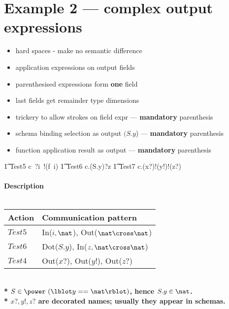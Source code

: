 \documentclass{article}
\begin{document}
\newpage
\section{Example 2 --- complex output expressions}

\begin{itemize}
   \item hard spaces - make no semantic difference
   \item application expressions on output fields
   \item parenthesised expressions form \textbf{one} field
   \item last fields get remainder type dimensions
   \item trickery to allow strokes on field expr --- \textbf{mandatory} parenthesis
   \item schema binding selection as output $(S.y$) --- \textbf{mandatory} parenthesis
   \item function application result as output --- \textbf{mandatory} parenthesis
\end{itemize}

\begin{circusaction}
   \t1 Test5 \circdef c~?i~!(f~i) \then \Skip
       \also
   \t1 Test6 \circdef c.(S.y)?z \then \Skip
       \also
   \t1 Test7 \circdef c.(x?)!(y!)!(z?) \then \Skip
\end{circusaction}

\paragraph{Description \\ \\}

\vspace{2pt}
\begin{tabular}{l|l}
   \hline
   Action   & Communication pattern \\
   \hline
   $Test5$  & In($i, \nat$), Out($\nat \cross \nat$) \\
   \hline
   $Test6$  & Dot($S.y$), In($z, \nat \cross \nat$) \\
   \hline
   $Test4$  & Out($x?$), Out($y!$), Out($z?$) \\
   \hline
\end{tabular}
\\

\textbf{* $S \in \power~(\lblot y == \nat \rblot)$, hence $S.y \in \nat$.}
\\
\indent \textbf{* $x?, y!, z?$ are decorated names; usually they appear in schemas.}
\end{document}
